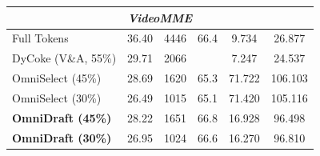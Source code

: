 \begin{table}[t]
{\begin{tabular}{@{}lccccc@{}}
\midrule
\multicolumn{6}{c}{\textit{VideoMME}} \\
\midrule
Full Tokens & 36.40 & 4446 & 66.4 & 9.734 & 26.877 \\
DyCoke (V\&A, 55\%) & 29.71 & 2066 &  & 7.247 & 24.537 \\
OmniSelect (45\%) & 28.69 & 1620 & 65.3 & 71.722 & 106.103 \\
OmniSelect (30\%) & 26.49 & 1015 & 65.1 & 71.420 & 105.116 \\
\textbf{OmniDraft (45\%)} & 28.22 & 1651 & 66.8 & 16.928 & 96.498 \\
\textbf{OmniDraft (30\%)} & 26.95 & 1024 & 66.6 & 16.270 & 96.810 \\
\bottomrule
\end{tabular}
}
\end{table}
